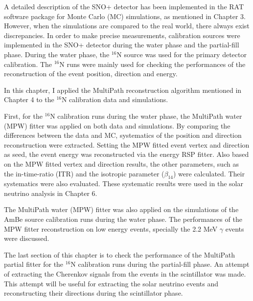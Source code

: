A detailed description of the SNO+ detector has been implemented in the RAT software package for Monte Carlo (MC) simulations, as mentioned in Chapter 3. However, when the simulations are compared to the real world, there always exist discrepancies. In order to make precise measurements, calibration sources were implemented in the SNO+ detector during the water phase and the partial-fill phase. During the water phase, the $^{16}$N source was used for the primary detector calibration. The $^{16}$N runs were mainly used for checking the performances of the reconstruction of the event position, direction and energy. 

In this chapter, I applied the MultiPath reconstruction algorithm mentioned in Chapter 4 to the $^{16}$N calibration data and simulations.

First, for the $^{16}$N calibration runs during the water phase, the MultiPath water (MPW) fitter was applied on both data and simulations. By comparing the differences between the data and MC, systematics of the position and direction reconstruction were extracted. Setting the MPW fitted event vertex and direction as seed, the event energy was reconstructed via the energy RSP fitter. Also based on the MPW fitted vertex and direction results, the other parameters, such as the in-time-ratio (ITR) and the isotropic parameter ($\beta_{14}$) were calculated. Their systematics were also evaluated. These systematic results were used in the solar neutrino analysis in Chapter 6.

The MultiPath water (MPW) fitter was also applied on the simulations of the AmBe source calibration runs during the water phase. The performances of the MPW fitter reconstruction on low energy events, specially the 2.2 MeV $\gamma$ events were discussed.

The last section of this chapter is to check the performance of the MultiPath partial fitter for the $^{16}$N calibration runs during the partial-fill phase. An attempt of extracting the Cherenkov signals from the events in the scintillator was made. This attempt will be useful for extracting the solar neutrino events and reconstructing their directions during the scintillator phase. 

